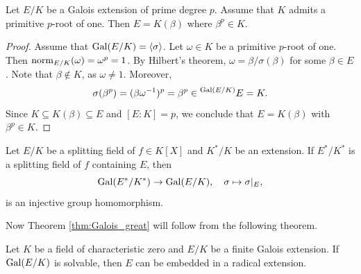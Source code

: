 \begin{lemma}
\label{lem:E=K(beta)}
    Let $E/K$ be a Galois extension of prime degree $p$. Assume that $K$ admits a primitive $p$-root of one. 
    Then $E=K(\beta)$ where $\beta^p\in K$. 
\end{lemma}

\begin{proof}
    Assume that $\operatorname{Gal}(E/K)=\langle\sigma\rangle$. 
    Let $\omega\in K$ be a primitive $p$-root of one. Then $\operatorname{norm}_{E/K}(\omega)=\omega^p=1$. By Hilbert's theorem, 
    $\omega=\beta/\sigma(\beta)$ for some $\beta\in E$. Note that $\beta\not\in K$, as $\omega\ne1$. Moreover, 
    \[
    \sigma(\beta^p)=(\beta\omega^{-1})^p=\beta^p\in\prescript{\operatorname{Gal}(E/K)}{}{E}=K.
    \]
    Since $K\subseteq K(\beta)\subseteq E$ and $[E:K]=p$, we conclude that $E=K(\beta)$ with $\beta^p\in K$. 
\end{proof}

\begin{exercise}
\label{xca:embedding}
    Let $E/K$ be a splitting field of $f\in K[X]$ and $K^*/K$ be an extension.
    If $E^*/K^*$ is a splitting field of $f$ containing $E$, then 
    \[
    \operatorname{Gal}(E^*/K^*)\to\operatorname{Gal}(E/K),\quad \sigma\mapsto\sigma|_{E},
    \]
    is an injective group homomorphism. 
\end{exercise}

Now Theorem \ref{thm:Galois_great} will follow from the following theorem. 

\begin{theorem}
    Let $K$ be a field of characteristic zero and $E/K$ be a finite Galois extension.
    If $\operatorname{Gal}(E/K)$ is solvable, then $E$ can be embedded in a radical extension. 
\end{theorem}

